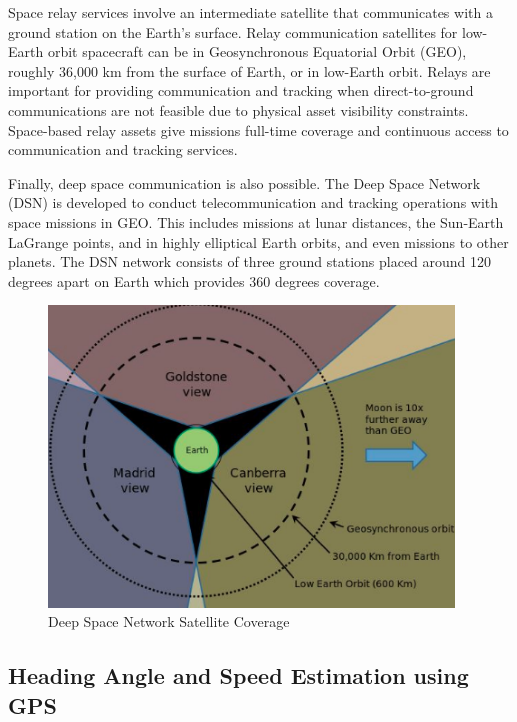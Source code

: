 \documentclass{article}
\begin{document}
Space relay services involve an intermediate satellite that
communicates with a ground station on the Earth’s surface. Relay
communication satellites for low-Earth orbit spacecraft can be in
Geosynchronous Equatorial Orbit (GEO), roughly 36,000 km from the
surface of Earth, or in low-Earth orbit. Relays are important for
providing communication and tracking when direct-to-ground
communications are not feasible due to physical asset visibility
constraints.  Space-based relay assets give missions full-time
coverage and continuous access to communication and tracking
services. 

Finally, deep space communication is also possible. The Deep Space
Network (DSN) is developed to conduct telecommunication and tracking
operations with space missions in GEO. This includes missions at lunar
distances, the Sun-Earth LaGrange points, and in highly elliptical
Earth orbits, and even missions to other planets\cite{qp40}. The DSN network
consists of three ground stations placed around 120 degrees apart on
Earth which provides 360 degrees coverage\cite{qp41}.
\begin{figure}[H]
  \begin{center}
  \includegraphics[height=80mm]{Figures/DSNSC}
  \end{center}
  \caption{Deep Space Network Satellite Coverage \cite{qp42}}
\end{figure}

\subsection{Heading Angle and Speed Estimation using GPS}
\end{document}
